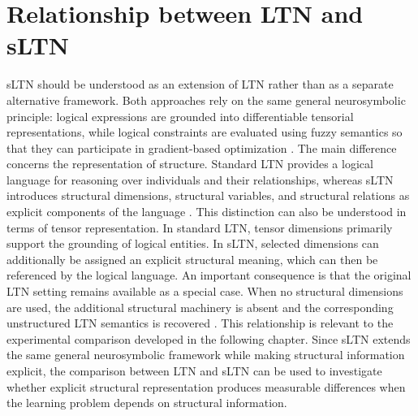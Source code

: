 \section{Relationship between LTN and sLTN}
\noindent
sLTN should be understood as an extension of LTN rather than as a separate alternative framework. Both approaches rely on the same general neurosymbolic principle: logical expressions are grounded into differentiable tensorial representations, while logical constraints are evaluated using fuzzy semantics so that they can participate in gradient-based optimization \cite{badreddine2022logic,rinaldi2026sltn}.
The main difference concerns the representation of structure. Standard LTN provides a logical language for reasoning over individuals and their relationships, whereas sLTN introduces structural dimensions, structural variables, and structural relations as explicit components of the language \cite{rinaldi2026sltn}.
This distinction can also be understood in terms of tensor representation. In standard LTN, tensor dimensions primarily support the grounding of logical entities. In sLTN, selected dimensions can additionally be assigned an explicit structural meaning, which can then be referenced by the logical language.
An important consequence is that the original LTN setting remains available as a special case. When no structural dimensions are used, the additional structural machinery is absent and the corresponding unstructured LTN semantics is recovered \cite{rinaldi2026sltn}.
This relationship is relevant to the experimental comparison developed in the following chapter. Since sLTN extends the same general neurosymbolic framework while making structural information explicit, the comparison between LTN and sLTN can be used to investigate whether explicit structural representation produces measurable differences when the learning problem depends on structural information.

